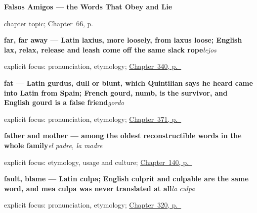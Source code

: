 \noindent\begin{minipage}[t]{\linewidth}
\raggedright
\textbf{Falsos Amigos --- the Words That Obey and Lie}\par
\footnotesize chapter topic; \hyperref[ch:falsos-amigos]{Chapter~66, p.~\pageref*{ch:falsos-amigos}}
\end{minipage}\par\smallskip

\noindent\begin{minipage}[t]{\linewidth}
\raggedright
\textbf{far, far away — Latin laxius, more loosely, from laxus loose; English lax, relax, release and leash come off the same slack rope}\enspace\emph{lejos}\par
\footnotesize explicit focus: pronunciation, etymology; \hyperref[ch:cerca-y-lejos]{Chapter~340, p.~\pageref*{ch:cerca-y-lejos}}
\end{minipage}\par\smallskip

\noindent\begin{minipage}[t]{\linewidth}
\raggedright
\textbf{fat — Latin gurdus, dull or blunt, which Quintilian says he heard came into Latin from Spain; French gourd, numb, is the survivor, and English gourd is a false friend}\enspace\emph{gordo}\par
\footnotesize explicit focus: pronunciation, etymology; \hyperref[ch:pequeno-y-gordo]{Chapter~371, p.~\pageref*{ch:pequeno-y-gordo}}
\end{minipage}\par\smallskip

\noindent\begin{minipage}[t]{\linewidth}
\raggedright
\textbf{father and mother — among the oldest reconstructible words in the whole family}\enspace\emph{el padre, la madre}\par
\footnotesize explicit focus: etymology, usage and culture; \hyperref[ch:spanish-family]{Chapter~140, p.~\pageref*{ch:spanish-family}}
\end{minipage}\par\smallskip

\noindent\begin{minipage}[t]{\linewidth}
\raggedright
\textbf{fault, blame — Latin culpa; English culprit and culpable are the same word, and mea culpa was never translated at all}\enspace\emph{la culpa}\par
\footnotesize explicit focus: pronunciation, etymology; \hyperref[ch:favor-y-culpa]{Chapter~320, p.~\pageref*{ch:favor-y-culpa}}
\end{minipage}\par\smallskip

